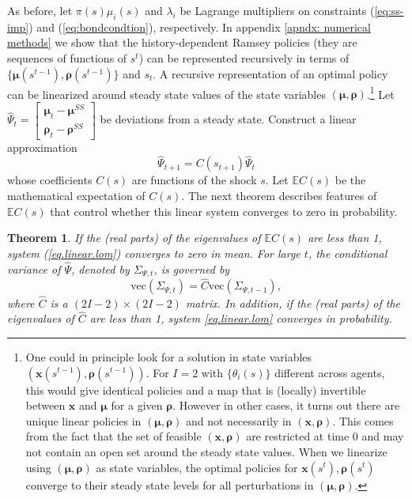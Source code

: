 \documentclass[thmsb,11pt]{article}
\newtheorem{theorem}{Theorem}
\newcommand{\bmat}{\begin{matrix}}
\newcommand{\emat}{\end{matrix}}
\begin{document}
As before, let $\pi(s)\mu_i(s)$ and $\lambda_i$ be Lagrange multipliers on constraints (\ref{eq:ss-imp}) and (\ref{eq:bondcondtion}), respectively.
In appendix \ref{apndx: numerical methods} we show that the history-dependent Ramsey policies
(they are sequences of functions of $s^t$) can be represented  recursively in terms of $\{\bm \mu(s^{t-1}),\bm \rho(s^{t-1})\}$ and $s_t$.
A recursive representation of an optimal policy can be linearized around  steady state values of the state
variables  $(\bm{\mu},\bm{\rho})$.\footnote{One could  in principle look for a solution in state variables $\left(\bm{x}(s^{t-1}),\bm{\rho}(s^{t-1})\right)$.
For $I=2$ with $\{\theta_i(s)\}$ different across agents, this would give identical policies and a map that is (locally) invertible between $\bm{x}$ and $\bm{\mu}$ for
a given $\bm{\rho}$. However in other cases, it turns out there are unique linear policies in $(\bm{\mu},\bm{\rho}
)$ and not necessarily in  $(\bm{x},\bm{\rho})$. This comes from the fact that the set of feasible $(\bm{x},\bm{\rho})$ are restricted at time 0 and may not contain an open set around the steady state values. When we linearize using $(\bm{\mu},\bm{\rho})$ as state variables, the optimal policies for $\bm{x}(s^t),\bm{\rho}(s^t)$ converge to their  steady state levels for all perturbations in $(\bm{\mu},\bm{\rho})$.}
Let $\hat{\Psi}_{t}= \left[\bmat \bm{\mu}_{t} - \bm{\mu}^{SS}\\ \bm \rho_t - \bm \rho^{SS}\emat\right]$ be  deviations from a steady state.
Construct a  linear approximation
\begin{equation}
 \hat{\Psi}_{t+1}=C(s_{t+1})\hat{\Psi}_t \label{eq.linear.lom}
\end{equation}
whose coefficients $C(s)$   are functions of the shock $s$. Let $\mathbb{E}C(s)$  be the mathematical expectation of  $C(s)$. The next theorem describes features of $\mathbb{E}C(s)$ that control whether  this linear system converges to zero in probability.

\begin{theorem}\label{thm: localstability}
If the (real parts) of the eigenvalues of $\mathbb{E}C(s)$ are less than 1,  system (\ref{eq.linear.lom}) converges to zero  in mean.
For large $t$, the conditional variance of $\hat{\Psi}$, denoted by $\Sigma_{\Psi,t}$, is governed by
\[\text{vec}(\Sigma_{\Psi,t})=\widehat{C} \text{vec}(\Sigma_{\Psi,t-1}),\]	
where $\widehat{C}$ is a $(2I-2) \times (2I-2)$ matrix. In addition,  if the (real parts) of the eigenvalues of $\widehat{C}$ are less than 1, system \eqref{eq.linear.lom}
converges in probability.
\end{theorem}
\end{document}
